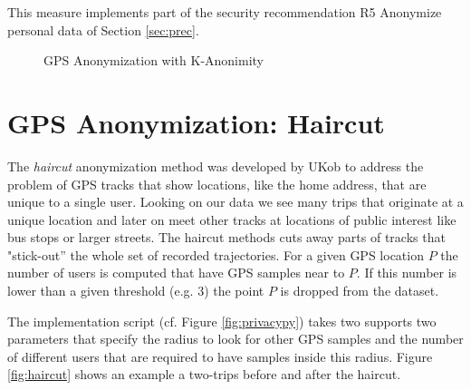 This measure implements part of the security recommendation R5
Anonymize personal data of Section \ref{sec:prec}.

\begin{figure}
  \centering
  \quad
  \caption{GPS Anonymization with K-Anonimity}
  \label{fig:k-ano}
\end{figure}

\section{GPS Anonymization: Haircut}

The \emph{haircut} anonymization method was developed by UKob to
address the problem of GPS tracks that show locations, like the home
address, that are unique to a single user. Looking on our data we see
many trips that originate at a unique location and later on meet other
tracks at locations of public interest like bus stops or larger
streets. The haircut methods cuts away parts of tracks that
"stick-out'' the whole set of recorded trajectories. For a given GPS
location $P$ the number of users is computed that have GPS samples
near to $P$. If this number is lower than a given threshold (e.g. $3$)
the point $P$ is dropped from the dataset.

The implementation script (cf. Figure \ref{fig:privacypy}) takes two
supports two parameters that specify the radius to look for other GPS
samples and the number of different users that are required to have
samples inside this radius. Figure \ref{fig:haircut} shows an example
a two-trips before and after the haircut.

